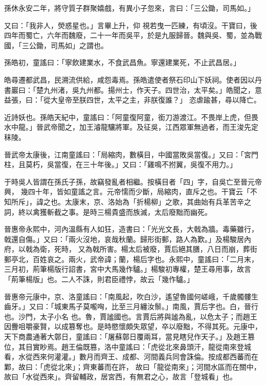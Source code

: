 \begin{pinyinscope}
 孫休永安二年，將守質子群聚嬉戲，有異小子忽來，言曰：「三公鋤，司馬如。」



 又曰：「我非人，熒惑星也。」言畢上升，仰
 視若曳一匹練，有頃沒。干寶曰，後四年而蜀亡，六年而魏廢，二十一年而吳平，於是九服歸晉。魏與吳、蜀，並為戰國，「三公鋤，司馬如」之謂也。



 孫皓初，童謠曰：「寧飲建業水，不食武昌魚。寧還建業死，不止武昌居。」



 皓尋遷都武昌，民溯流供給，咸怨毒焉。孫皓遣使者祭石印山下妖祠。使者因以丹書巖曰：「楚九州渚，吳九州都。揚州士，作天子。四世治，太平矣。」皓聞之，意益張，曰：「從大皇帝至朕四世，太平之主，非朕復誰？」
 恣虐踰甚，尋以降亡。



 近詩妖也。孫皓天紀中，童謠曰：「阿童復阿童，銜刀游渡江。不畏岸上虎，但畏水中龍。」晉武帝聞之，加王濬龍驤將軍。及征吳，江西眾軍無過者，而王浚先定秣陵。



 晉武帝太康後，江南童謠曰：「局縮肉，數橫目，中國當敗吳當復。」又曰：「宮門柱，且莫朽，吳當復，在三十年後。」又曰：「雞鳴不拊翼，吳復不用力。」



 于時吳人皆謂在孫氏子孫，故竊發亂者相繼。按橫目者「四」字，自吳亡至晉元帝興，
 幾四十年，皆如童謠之言。元帝懦而少斷，局縮肉，直斥之也。干寶云「不知所斥」，諱之也。太康末，京、洛始為「折楊柳」之歌，其曲始有兵革苦辛之詞，終以禽獲斬截之事。是時三楊貴盛而族滅，太后廢黜而幽死。



 晉惠帝永熙中，河內溫縣有人如狂，造書曰：「光光文長，大戟為牆。毒藥雖行，戟還自傷。」又曰：「兩火沒地，哀哉秋蘭。歸形街郵，路人為歎。」及楊駿居內府，以戟為衛，死時，
 又為戟所害。楊太后被廢，賈后絕其膳，八日而崩，葬街郵亭北，百姓哀之。兩火，武帝諱；蘭，楊后字也。永熙中，童謠曰：「二月末，三月初，荊筆楊版行詔書，宮中大馬幾作驢。」楊駿初專權，楚王尋用事，故言「荊筆楊版」也。二人不誅，則君臣禮悖，故云「幾作驢。」



 晉惠帝元康中，京、洛童謠曰：「南風起，吹白沙，遙望魯國何嵯峨，千歲髑髏生齒牙。」又曰：「城東馬子莫嚨哅，比至三月纏汝鬃。」南風，賈后字也。白，晉行也。沙門，太子小名
 也。魯，賈謐國也。言賈后將與謐為亂，以危太子；而趙王因釁咀嚼豪賢，以成篡奪也。是時愍懷頗失眾望，卒以廢黜，不得其死。元康中，天下商農通著大鄣日，童謠曰：「屠蘇鄣日覆兩耳，當見瞎兒作天子。」及趙王篡位，其目實眇焉。趙王倫既篡，洛中童謠曰：「虎從北來鼻頭汗，龍從南來登城看，水從西來何灌灌。」數月而齊王、成都、河間義兵同會誅倫。按成都西蕃而在鄴，故曰：「虎從北來」；齊東蕃而在許，
 故曰「龍從南來」；河間水區而在關中，故曰「水從西來」。齊留輔政，居宮西，有無君之心，故言「登城看」也。




\end{pinyinscope}
